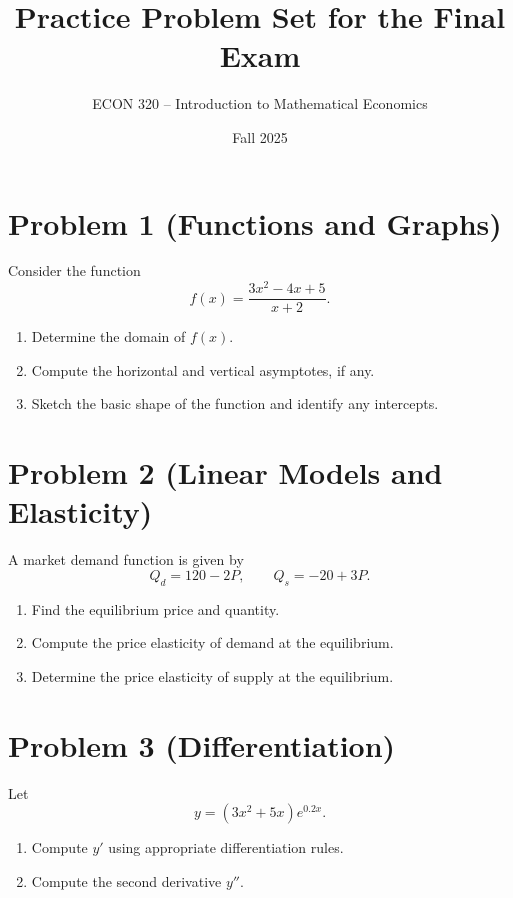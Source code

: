 \documentclass[12pt]{article}
\title{Practice Problem Set for the Final Exam}
\author{ECON 320 -- Introduction to Mathematical Economics}
\date{Fall 2025}
\begin{document}
\maketitle

\section*{Problem 1 (Functions and Graphs)}

Consider the function
\[
f(x)=\frac{3x^2 - 4x + 5}{x+2}.
\]

\begin{enumerate}
    \item Determine the domain of \(f(x)\).
    \item Compute the horizontal and vertical asymptotes, if any.
    \item Sketch the basic shape of the function and identify any intercepts.
\end{enumerate}




\section*{Problem 2 (Linear Models and Elasticity)}

A market demand function is given by
\[
Q_d = 120 - 2P,
\qquad
Q_s = -20 + 3P.
\]

\begin{enumerate}
    \item Find the equilibrium price and quantity.
    \item Compute the price elasticity of demand at the equilibrium.
    \item Determine the price elasticity of supply at the equilibrium.
\end{enumerate}

\newpage

\section*{Problem 3 (Differentiation)}

Let
\[
y = (3x^2 + 5x) e^{0.2x}.
\]

\begin{enumerate}
    \item Compute \(y'\) using appropriate differentiation rules.
    \item Compute the second derivative \(y''\).
\end{enumerate}
\end{document}
